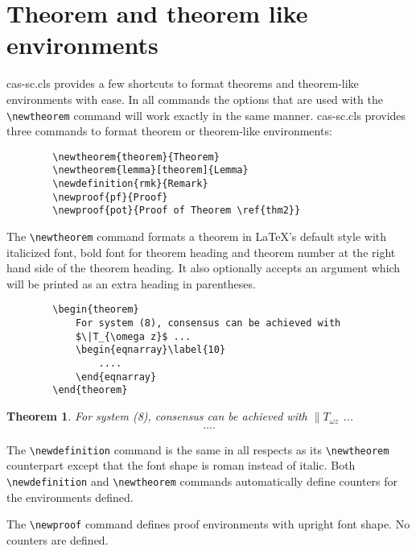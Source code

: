 \documentclass[a4paper,fleqn]{cas-sc}
\begin{document}
	\section[Theorem and ...]{Theorem and theorem like environments}
	
	{cas-sc.cls} provides a few shortcuts to format theorems and
	theorem-like environments with ease. In all commands the options that
	are used with the \verb+\newtheorem+ command will work exactly in the same
	manner. {cas-sc.cls} provides three commands to format theorem or
	theorem-like environments: 
	
	\begin{verbatim}
		\newtheorem{theorem}{Theorem}
		\newtheorem{lemma}[theorem]{Lemma}
		\newdefinition{rmk}{Remark}
		\newproof{pf}{Proof}
		\newproof{pot}{Proof of Theorem \ref{thm2}}
	\end{verbatim}
	
	
	The \verb+\newtheorem+ command formats a
	theorem in \LaTeX's default style with italicized font, bold font
	for theorem heading and theorem number at the right hand side of the
	theorem heading.  It also optionally accepts an argument which
	will be printed as an extra heading in parentheses. 
	
	\begin{verbatim}
		\begin{theorem} 
			For system (8), consensus can be achieved with 
			$\|T_{\omega z}$ ...
			\begin{eqnarray}\label{10}
				....
			\end{eqnarray}
		\end{theorem}
	\end{verbatim}  
	
	\newtheorem{theorem}{Theorem}
	
	\begin{theorem}
		For system (8), consensus can be achieved with 
		$\|T_{\omega z}$ ...
		\begin{eqnarray}\label{10}
			....
		\end{eqnarray}
	\end{theorem}
	
	The \verb+\newdefinition+ command is the same in
	all respects as its \verb+\newtheorem+ counterpart except that
	the font shape is roman instead of italic.  Both
	\verb+\newdefinition+ and \verb+\newtheorem+ commands
	automatically define counters for the environments defined.
	
	The \verb+\newproof+ command defines proof environments with
	upright font shape.  No counters are defined. 
	
\end{document}
